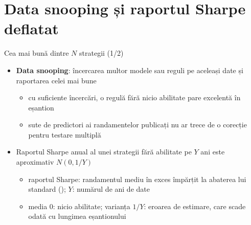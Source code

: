 \section{Data snooping și raportul Sharpe deflatat}

\begin{frame}{Cea mai bună dintre $N$ strategii (1/2)}
\itemsize{\small}
\begin{itemize}
    \item \textbf{Data snooping}: încercarea multor modele sau reguli pe aceleași date și raportarea celei mai bune 
    \begin{itemize}
        \item cu suficiente încercări, o regulă fără nicio abilitate pare excelentă în eșantion
        \item sute de predictori ai randamentelor publicați nu ar trece de o corecție pentru testare multiplă 
    \end{itemize}
    \item Raportul Sharpe anual al unei strategii fără abilitate pe $Y$ ani este aproximativ $N(0, 1/Y)$
    \begin{itemize}
        \item raportul Sharpe: randamentul mediu în exces împărțit la abaterea lui standard (); $Y$: numărul de ani de date
        \item media 0: nicio abilitate; varianța $1/Y$: eroarea de estimare, care scade odată cu lungimea eșantionului
    \end{itemize}
\end{itemize}
\end{frame}


